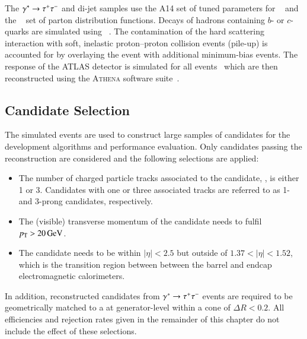 The $\gamma^{*} \to \tau^{+} \tau^{-}$ and di-jet samples use the A14 set of
tuned parameters for \PYTHIA[8]~\cite{ATL-PHYS-PUB-2014-021} and the
\NNPDF[2.3lo]~\cite{Ball:2012cx} set of parton distribution functions.
Decays of hadrons containing $b$- or $c$-quarks are simulated using
\EVTGEN[v1.2.0]~\cite{Lange:2001uf}. The contamination of the hard
scattering interaction with soft, inelastic proton--proton collision
events (pile-up) is accounted for by overlaying the event with
additional minimum-bias events. The response of the ATLAS detector is
simulated for all events~\cite{SOFT-2010-01} which are then
reconstructed using the \textsc{Athena} software
suite~\cite{ATL-SOFT-PUB-2021-001}.


\subsection{\tauhadvis Candidate Selection}
\label{sec:tauid_candidate_selection}

The simulated events are used to construct large samples of \tauhadvis
candidates for the development \tauid algorithms and performance
evaluation. Only \tauhadvis candidates passing the reconstruction are
considered and the following selections are applied:
\begin{itemize}

\item The number of charged particle tracks associated to the
  \tauhadvis candidate, \Ntracks, is either 1 or 3. Candidates with
  one or three associated tracks are referred to as 1- and 3-prong
  \tauhadvis candidates, respectively.

\item The (visible) transverse momentum of the candidate needs to
  fulfil $\pT > \SI{20}{\GeV}$.

\item The \tauhadvis candidate needs to be within $|\eta| < 2.5$ but
  outside of $1.37 < |\eta| < 1.52$, which is the transition region
  between between the barrel and endcap electromagnetic calorimeters.

\end{itemize}
In addition, reconstructed \tauhadvis candidates from
$\gamma^{*} \to \tau^{+} \tau^{-}$ events are required to be geometrically
matched to a \tauhad at generator-level within a cone of
$\Delta R < 0.2$.
All efficiencies and rejection rates given in the remainder of this
chapter do not include the effect of these selections.

